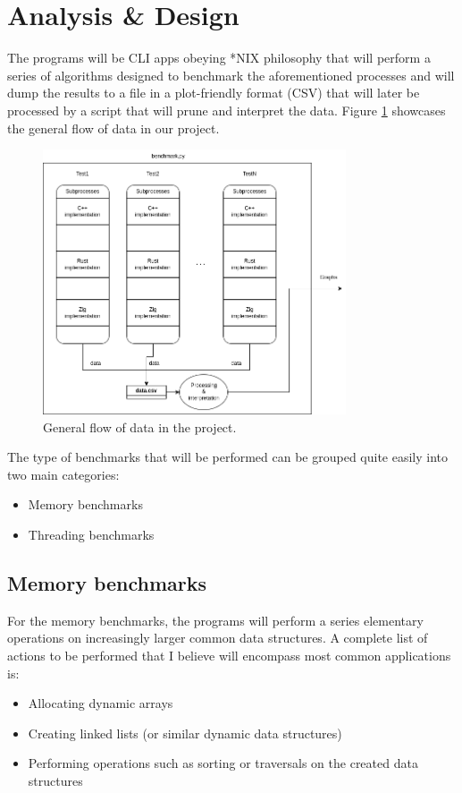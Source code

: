 \documentclass{article}
\begin{document}
\section{Analysis \& Design}
The programs will be CLI apps obeying *NIX philosophy that will perform a series of algorithms designed to benchmark the aforementioned processes and will dump the results to a file in a plot-friendly format (CSV) that will later be processed by a script that will prune and interpret the data.
Figure \ref{fig:flow} showcases the general flow of data in our project.
\begin{figure}[h]
    \centering
    \includegraphics[width=0.8\textwidth]{structure.png}
    \caption{General flow of data in the project.}
    \label{fig:flow}
\end{figure}


The type of benchmarks that will be performed can be grouped quite easily into two main categories:
\begin{itemize}
    \item Memory benchmarks
    \item Threading benchmarks
\end{itemize}

\subsection{Memory benchmarks}
For the memory benchmarks, the programs will perform a series elementary operations on increasingly larger common data structures. A complete list of actions to be performed that I believe will encompass most common applications is:
\begin{itemize}
    \item Allocating dynamic arrays
    \item Creating linked lists (or similar dynamic data structures)
    \item Performing operations such as sorting or traversals on the created data structures
\end{itemize}
\end{document}
